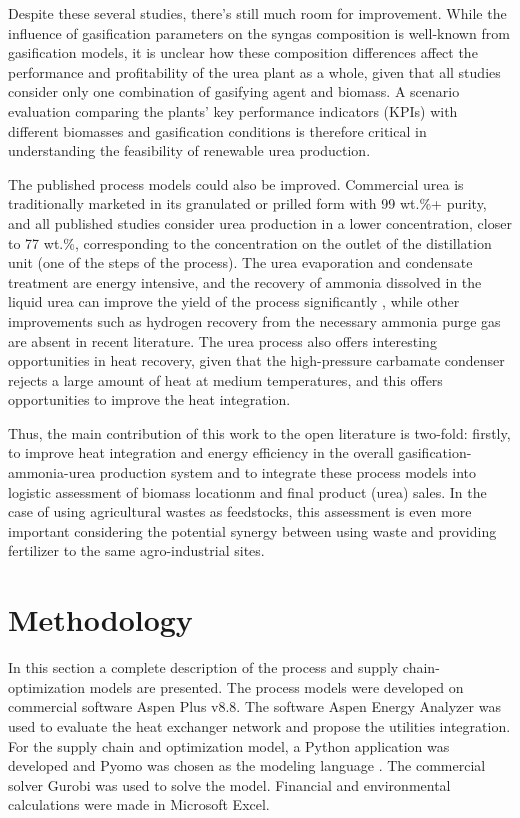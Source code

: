 \documentclass[a4paper, titlepage]{article}
\begin{document}
Despite these several studies, there's still much room for improvement. While the influence of gasification parameters
on the syngas composition is well-known from gasification models, it is unclear how these composition differences affect
the performance and profitability of the urea plant as a whole, given that all studies consider only one combination of
gasifying agent and biomass. A scenario evaluation comparing the plants’ key performance indicators (KPIs) with
different biomasses and gasification conditions is therefore critical in understanding the feasibility of renewable urea
production.

The published process models could also be improved. Commercial urea is traditionally marketed in its granulated or
prilled form with 99 wt.\%+ purity, and all published studies consider urea production in a lower concentration, closer
to 77 wt.\%, corresponding to the concentration on the outlet of the distillation unit (one of the steps of the
process). The urea evaporation and condensate treatment are energy intensive, and the recovery of ammonia dissolved in
the liquid urea can improve the yield of the process significantly \cite{meessenUreaSynthesis2014}, while other
improvements such as hydrogen recovery from the necessary ammonia purge gas are absent in recent literature. The urea
process also offers interesting opportunities in heat recovery, given that the high-pressure carbamate condenser rejects
a large amount of heat at medium temperatures, and this offers opportunities to improve the heat integration.

Thus, the main contribution of this work to the open literature is two-fold: firstly, to improve heat integration and
energy efficiency in the overall gasification-ammonia-urea production system and to integrate these process models into
logistic assessment of biomass locationm and final product (urea) sales. In the case of using agricultural wastes as
feedstocks, this assessment is even more important considering the potential synergy between using waste and providing
fertilizer to the same agro-industrial sites.

\section{Methodology}

In this section a complete description of the process and supply chain-optimization models are presented. The process
models were developed on commercial software Aspen Plus v8.8\textregistered. The software Aspen Energy Analyzer was used
to evaluate the heat exchanger network and propose the utilities integration. For the supply chain and optimization
model, a Python application was developed and Pyomo was chosen as the modeling language
\cite{bynumPyomoOptimizationModeling2021}. The commercial solver Gurobi was used to solve the model. Financial and
environmental calculations were made in Microsoft Excel.
\end{document}

